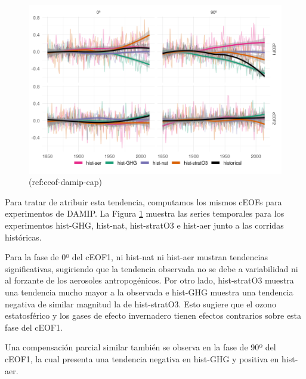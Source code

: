 \documentclass[12pt,oneside,a4paper]{reedthesis}
\begin{document}
\begin{figure}

{\centering \includegraphics{figures/50-cmip6/ceof-damip-1} 

}

\caption{(ref:ceof-damip-cap)}\label{fig:ceof-damip}
\end{figure}

Para tratar de atribuir esta tendencia, computamos los mismos cEOFs para experimentos de DAMIP.
La Figura \ref{fig:ceof-damip} muestra las series temporales para los experimentos hist-GHG, hist-nat, hist-stratO3 e hist-aer junto a las corridas históricas.

Para la fase de 0º del cEOF1, ni hist-nat ni hist-aer mustran tendencias significativas, sugiriendo que la tendencia observada no se debe a variabilidad ni al forzante de los aerosoles antropogénicos.
Por otro lado, hist-stratO3 muestra una tendencia mucho mayor a la observada e hist-GHG muestra una tendencia negativa de similar magnitud la de hist-stratO3.
Esto sugiere que el ozono estatosférico y los gases de efecto invernadero tienen efectos contrarios sobre esta fase del cEOF1.

Una compensación parcial similar también se observa en la fase de 90º del cEOF1, la cual presenta una tendencia negativa en hist-GHG y positiva en hist-aer.
\end{document}
